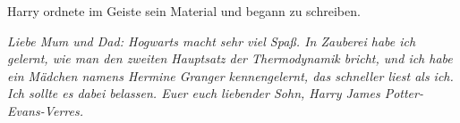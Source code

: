 Harry ordnete im Geiste sein Material und begann zu schreiben.

\emph{Liebe Mum und Dad: Hogwarts macht sehr viel Spaß. In Zauberei habe ich
gelernt, wie man den zweiten Hauptsatz der Thermodynamik bricht, und ich habe
ein Mädchen namens Hermine Granger kennengelernt, das schneller liest als ich.
Ich sollte es dabei belassen. Euer euch liebender Sohn, Harry James
Potter-Evans-Verres. }
